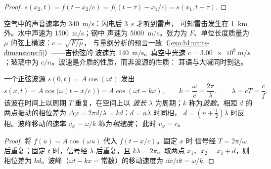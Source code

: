 \begin{proof}
$s(x_2, t) = f(t - x_2/c) = f\big((t - \tau) - x_1/c\big) = s(x_1, t - \tau)$.
\end{proof}

\begin{example}[波速]\label{ex:b1:wave-propagation:celerities}
空气中的声音速率为 \qty{340}{m/s}：闪电后 \qty{3}{s} 才听到雷声，
可知雷击发生在 \qty{1}{km} 外。水中声速为 \qty{1500}{m/s}；钢中
声速为 \qty{5000}{m/s}。张力为 $F$、单位长度质量为
$\mu$ 的弦上横波：$c = \sqrt{F/\mu}$，
与量纲分析的预言一致（\cref{exo:b1:units-dimensions:5}）——吉他弦的
波速为 \qty{140}{m/s}。真空中光速 $c = \qty{3.00e8}{m/s}$；玻璃中为
$c/n$。波速是介质的性质，而非波源的性质：
耳语与大喊同时到达。
\end{example}

\begin{proposition}[正弦行波]\label{prop:b1:wave-propagation:sinusoidal}
一个正弦波源 $s(0, t) = A\cos(\omega t)$ 发出
\[
s(x, t) = A\cos\!\big(\omega(t - x/c)\big) = A\cos(\omega t - kx),
\qquad k = \frac{\omega}{c} = \frac{2\pi}{\lambda},
\qquad \lambda = cT = \frac{c}{f}.
\]
该波在时间上以周期 $T$ 重复，在空间上以
\emph{波长} $\lambda$ 为周期；$k$ 称为\emph{波数}。相距
$d$ 的两点振动的相位差为
$\Delta\varphi = 2\pi d/\lambda = kd$：$d = n\lambda$ 时同相，
$d = (n + \tfrac12)\lambda$ 时反相。波峰移动的速率
$v_\varphi = \omega/k$ 称为\emph{相速度}；
此时 $v_\varphi = c$。
\end{proposition}

\begin{proof}
将 $f(u) = A\cos(\omega u)$ 代入 $f(t - x/c)$。固定 $x$ 时
信号经 $T = 2\pi/\omega$ 后重复；固定 $t$ 时，信号经
$\lambda$ 后重复，且 $k\lambda = 2\pi$。取两点 $x_1$、$x_2 = x_1 + d$，则
相位差为 $kd$。波峰（$\omega t - kx = \text{常数}$）的移动速度为
$\dd x/\dd t = \omega/k$.
\end{proof}

